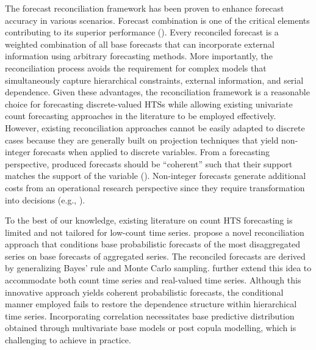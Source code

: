 \documentclass[a4paper,review,12pt,authoryear]{elsarticle}
\begin{document}
The forecast reconciliation framework has been proven to enhance forecast accuracy in various scenarios.
Forecast combination is one of the critical elements contributing to its superior performance (\citealp{hollymanUnderstandingForecastReconciliation2021}).
Every reconciled forecast is a weighted combination of all base forecasts that
can incorporate external information using arbitrary forecasting methods.
More importantly, the reconciliation process avoids the requirement for complex models that simultaneously capture hierarchical constraints, external information, and serial dependence.
Given these advantages, the reconciliation framework is a reasonable choice for forecasting discrete-valued HTSs while allowing existing univariate count forecasting approaches in the literature to be employed effectively.
However, existing reconciliation approaches cannot be easily adapted to discrete cases because they are generally built on projection techniques that yield non-integer forecasts when applied to discrete variables.
From a forecasting perspective, produced forecasts should be ``coherent'' such that their support matches the support of the variable (\citealp{freelandForecastingDiscreteValued2004}).
Non-integer forecasts generate additional costs from an operational research perspective since they require transformation into decisions (e.g., \citealp{goltsosInventoryForecastingMind2022}).

To the best of our knowledge, existing literature on count HTS forecasting is limited and not tailored for low-count time series.
\cite{coraniProbabilisticReconciliationCount2022} propose a novel reconciliation approach that conditions base probabilistic forecasts of the most disaggregated series on base forecasts of aggregated series.
The reconciled forecasts are derived by generalizing Bayes’ rule and Monte Carlo sampling.
\cite{zambonEfficientProbabilisticReconciliation2022} further extend this idea to accommodate both count time series and real-valued time series.
Although this innovative approach yields coherent probabilistic forecasts,
the conditional manner employed fails to restore the dependence structure within hierarchical time series.
Incorporating correlation necessitates base predictive distribution obtained through multivariate base models or post copula modelling, which is challenging to achieve in practice.
\end{document}
